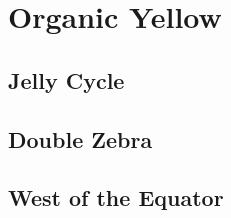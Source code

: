 \chapter{Organic Yellow}\margintoc
\section{Jelly Cycle}
\lipsum[1-6]
\section{Double Zebra}
\lipsum[1-3]
\section{West of the Equator}
\lipsum[1-4]
